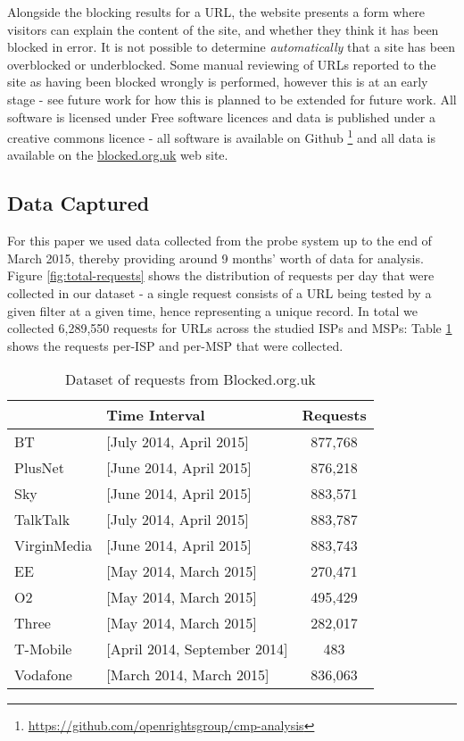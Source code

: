 \documentclass{bmcart}
\begin{document}
Alongside the blocking results for a URL, the website presents a form where visitors can explain the content of the site, and whether they think it has been blocked in error. 
It is not possible to determine \emph{automatically} that a site has been overblocked or underblocked.
Some manual reviewing of URLs reported to the site as having been blocked wrongly is performed, however this is at an early stage - see future work for how this is planned to be extended for future work.
All software is licensed under Free software licences and data is published under a creative commons licence - all software is available on Github \footnote{\url{https://github.com/openrightsgroup/cmp-analysis}} and all data is available on the \url{blocked.org.uk} web site.


\subsection*{Data Captured}
For this paper we used data collected from the probe system up to the end of March 2015, thereby providing around 9 months' worth of data for analysis.
Figure \ref{fig:total-requests} shows the distribution of requests per day that were collected in our dataset - a single request consists of a URL being tested by a given filter at a given time, hence representing a unique record.
In total we collected 6,289,550 requests for URLs across the studied ISPs and MSPs: Table \ref{tab:dataset_summary} shows the requests per-ISP and per-MSP that were collected.


\begin{table}[h!]
\caption{Dataset of requests from Blocked.org.uk}
  \begin{tabular}{ l l c}
    \hline
     & Time Interval & Requests \\
    \hline
	BT & [July 2014, April 2015] & 877,768 \\
	PlusNet & [June 2014, April 2015]  & 876,218 \\
    Sky & [June 2014, April 2015] & 883,571 \\
    TalkTalk & [July 2014, April 2015] & 883,787 \\
	VirginMedia & [June 2014, April 2015] & 883,743 \\
	\hline    
	EE & [May 2014, March 2015] & 270,471 \\
	O2 & [May 2014, March 2015] & 495,429 \\
	Three & [May 2014, March 2015] & 282,017 \\
	T-Mobile & [April 2014, September 2014] & 483 \\
	Vodafone & [March 2014, March 2015] & 836,063 \\
    \hline
  \end{tabular}
  \label{tab:dataset_summary}
\end{table}
\end{document}
